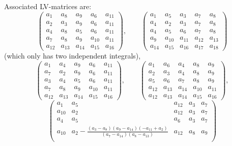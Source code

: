 \documentclass{article}
\begin{document}
\begin{enumerate}[1.]
Associated LV-matrices are:
\[
\begin{pmatrix}
a_{1} & a_{8} & a_{9} & a_{6} & a_{11} 
\\
 a_{2} & a_{3} & a_{9} & a_{6} & a_{11} 
\\
 a_{4} & a_{8} & a_{5} & a_{6} & a_{11} 
\\
 a_{7} & a_{8} & a_{9} & a_{10} & a_{11} 
\\
 a_{12} & a_{13} & a_{14} & a_{15} & a_{16}   
\end{pmatrix},\qquad 
\begin{pmatrix}
 a_{1} & a_{5} & a_{3} & a_{7} & a_{8} 
\\
 a_{4} & a_{2} & a_{3} & a_{7} & a_{8} 
\\
 a_{4} & a_{5} & a_{6} & a_{7} & a_{8} 
\\
 a_{9} & a_{10} & a_{11} & a_{12} & a_{13} 
\\
 a_{14} & a_{15} & a_{16} & a_{17} & a_{18}   
\end{pmatrix}
\]
(which only has two independent integrals),
\[
\begin{pmatrix}
a_{1} & a_{4} & a_{9} & a_{6} & a_{11} 
\\
 a_{7} & a_{2} & a_{9} & a_{6} & a_{11} 
\\
 a_{3} & a_{4} & a_{5} & a_{6} & a_{11} 
\\
 a_{7} & a_{8} & a_{9} & a_{10} & a_{11} 
\\
 a_{12} & a_{13} & a_{14} & a_{15} & a_{16}    
\end{pmatrix},\qquad
\begin{pmatrix}
  a_{1} & a_{6} & a_{4} & a_{8} & a_{9} 
\\
 a_{2} & a_{3} & a_{4} & a_{8} & a_{9} 
\\
 a_{5} & a_{6} & a_{7} & a_{8} & a_{9} 
\\
 a_{12} & a_{13} & a_{14} & a_{10} & a_{11} 
\\
 a_{12} & a_{13} & a_{14} & a_{15} & a_{16} 
\end{pmatrix},
\]
\[
\begin{pmatrix}
  a_{1} & a_{5} & a_{12} & a_{3} & a_{7} 
\\
 a_{10} & a_{2} & a_{12} & a_{3} & a_{7} 
\\
 a_{4} & a_{5} & a_{6} & a_{3} & a_{7} 
\\
 a_{10} & a_{2}-\frac{\left(a_{3}-a_{8}\right) \left(a_{9}-a_{14}\right) \left(-a_{11}+a_{2}\right)}{\left(a_{7}-a_{14}\right) \left(a_{8}-a_{13}\right)} & a_{12} & a_{8} & a_{9} 
\\

\end{pmatrix}\]
\end{enumerate}
\end{document}
